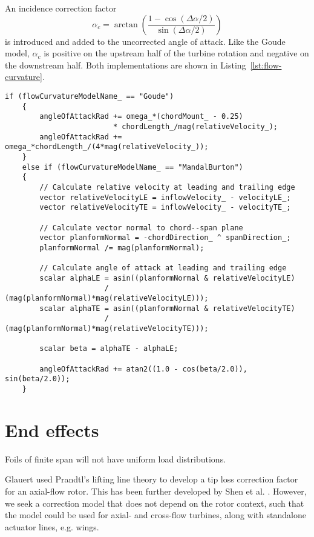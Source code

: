 An incidence correction factor
\begin{equation}
    \alpha_c = \arctan \left( \frac{1 - \cos (\Delta \alpha / 2)}{\sin (\Delta
        \alpha / 2)} \right)
    \label{eq:Mandal-Burton-alpha-corr}
\end{equation}
is introduced and added to the uncorrected angle of attack. Like the Goude
model, $\alpha_c$ is positive on the upstream half of the turbine rotation and
negative on the downstream half. Both implementations are shown in
Listing~\ref{lst:flow-curvature}.

\begin{lstlisting}[float,caption=Flow curvature model implementation.,label=lst:flow-curvature]
    if (flowCurvatureModelName_ == "Goude")
    {
        angleOfAttackRad += omega_*(chordMount_ - 0.25)
                         * chordLength_/mag(relativeVelocity_);
        angleOfAttackRad += omega_*chordLength_/(4*mag(relativeVelocity_));
    }
    else if (flowCurvatureModelName_ == "MandalBurton")
    {
        // Calculate relative velocity at leading and trailing edge
        vector relativeVelocityLE = inflowVelocity_ - velocityLE_;
        vector relativeVelocityTE = inflowVelocity_ - velocityTE_;
    
        // Calculate vector normal to chord--span plane
        vector planformNormal = -chordDirection_ ^ spanDirection_;
        planformNormal /= mag(planformNormal);
        
        // Calculate angle of attack at leading and trailing edge
        scalar alphaLE = asin((planformNormal & relativeVelocityLE)
                       / (mag(planformNormal)*mag(relativeVelocityLE)));
        scalar alphaTE = asin((planformNormal & relativeVelocityTE)
                       / (mag(planformNormal)*mag(relativeVelocityTE)));
        
        scalar beta = alphaTE - alphaLE;
        
        angleOfAttackRad += atan2((1.0 - cos(beta/2.0)), sin(beta/2.0));
    }
\end{lstlisting}


\section{End effects}

Foils of finite span will not have uniform load distributions.

Glauert used Prandtl's lifting line theory to develop a tip loss correction
factor for an axial-flow rotor. This has been further developed by Shen et al.
\cite{Shen2005a}. However, we seek a correction model that does not depend on
the rotor context, such that the model could be used for axial- and cross-flow
turbines, along with standalone actuator lines, e.g. wings.

